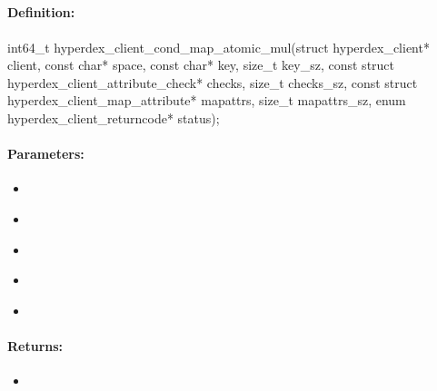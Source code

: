 \pagebreak
\subsection{}
\label{api:c:cond_map_atomic_mul}


\paragraph{Definition:}
\begin{ccode}
int64_t hyperdex_client_cond_map_atomic_mul(struct hyperdex_client* client,
        const char* space,
        const char* key, size_t key_sz,
        const struct hyperdex_client_attribute_check* checks, size_t checks_sz,
        const struct hyperdex_client_map_attribute* mapattrs, size_t mapattrs_sz,
        enum hyperdex_client_returncode* status);
\end{ccode}

\paragraph{Parameters:}
\begin{itemize}[noitemsep]
\item {}\\

\item {}\\

\item {}\\

\item {}\\

\item {}\\

\end{itemize}

\paragraph{Returns:}
\begin{itemize}[noitemsep]
\item {}\\

\end{itemize}

